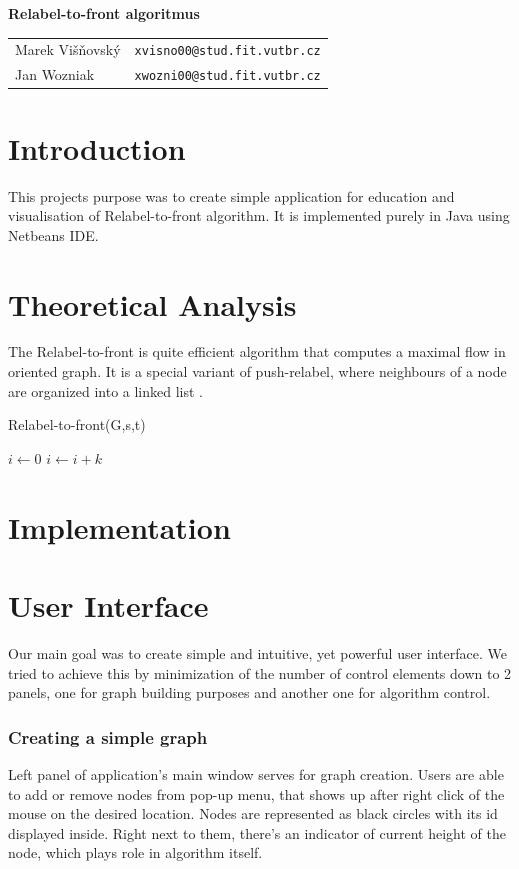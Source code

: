 \documentclass[a4paper,11pt]{article}
\begin{document}
\begin{center}{\LARGE\textbf{Relabel-to-front algoritmus}}\\[0.2cm]
\newcommand{\autor}[2]{#1&\texttt{#2@stud.fit.vutbr.cz}\tabularnewline}
\begin{tabular}{ll}
    \autor{Marek Višňovský}{xvisno00}
    \autor{Jan Wozniak}{xwozni00}
\end{tabular}
\end{center}

\section{Introduction}
This projects purpose was to create simple application for education and visualisation
of Relabel-to-front algorithm. It is implemented purely in Java using Netbeans
IDE.

\section{Theoretical Analysis}
The Relabel-to-front is quite efficient algorithm that computes a maximal flow in
oriented graph. It is a special variant of push-relabel, where neighbours of a node
are organized into a linked list \cite{rtf}. 

\begin{algorithm}
\caption{Relabel-to-front(G,s,t)}
\begin{algorithmic}
    \State $i\gets 0$
\Else
        \State $i\gets i+k$
    \EndIf
\EndIf
\end{algorithmic}
\end{algorithm}

\section{Implementation}



\section{User Interface}
Our main goal was to create simple and intuitive, yet powerful user interface. 
We tried to achieve this by minimization of the number of control elements down 
to 2 panels, one for graph building purposes and another one for algorithm control.

\subsubsection*{Creating a simple graph}
Left panel of application's main window serves for graph creation. Users are able 
to add or remove nodes from pop-up menu, that shows up after right click of the 
mouse on the desired location. Nodes are represented as black circles with its 
id displayed inside. Right next to them, there's an indicator of current height 
of the node, which plays role in algorithm itself.
\end{document}
